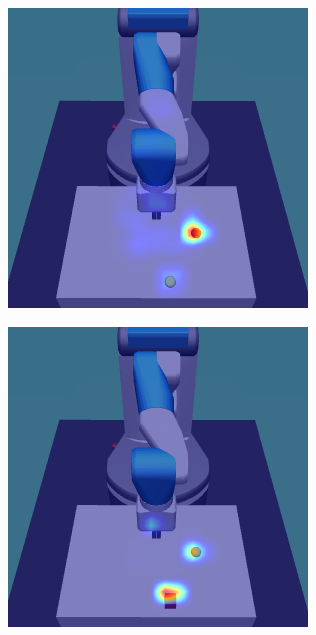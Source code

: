 \begin{figure}[h!]
  \begin{subfigure}{0.24\columnwidth}
    \includegraphics[width=\linewidth]{figures/chapter6/distractor_saliency_fetch_pro_on/color_sensor_std}
  \end{subfigure}
  \begin{subfigure}{0.24\columnwidth}
    \includegraphics[width=\linewidth]{figures/chapter6/distractor_saliency_fetch_pro_on/shape_sensor_std}
  \end{subfigure}
  

\end{figure}
